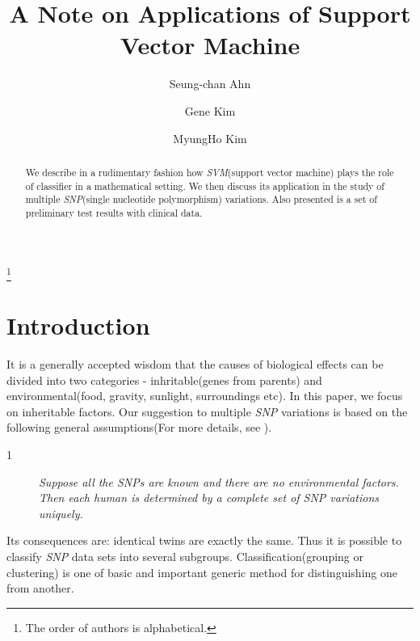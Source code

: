 \documentclass{amsart}%
\theoremstyle{plain}
\numberwithin{equation}{section}
\begin{document}
\title{A Note on Applications of Support Vector Machine}
\author{Seung-chan Ahn}
\address{Fermilab, MS 360, P.O. Box 500, Batavia, IL 60510}
\author{Gene Kim}
\address{19 Gage Road, East Brunswick, NJ 08816}
\author{MyungHo Kim}\thanks{%
The order of authors is alphabetical.}
\address{Genomics Collaborative Inc. 99 Erie Street, Cambridge, MA 02139}


\maketitle

\begin{abstract}
We describe in a rudimentary fashion how \emph{SVM}(support vector machine)
plays the role of classifier in a mathematical setting. We then discuss its
application in the study of multiple \emph{SNP}(single nucleotide
polymorphism) variations. Also presented is a set of preliminary test
results with clinical data.
\end{abstract}

\section{Introduction}

It is a generally accepted wisdom that the causes of biological effects can
be divided into two categories - inhritable(genes from parents) and
environmental(food, gravity, sunlight, surroundings etc). In this paper, we
focus on inheritable factors.  Our suggestion to multiple \emph{SNP}
variations is based on the following general assumptions(For more details,
see \cite{KK}).

\begin{description}
\item[1]  \emph{Suppose all the SNPs are known and there are no
environmental factors. Then each human is determined by a complete set of
SNP variations uniquely.}
\end{description}

Its consequences are: identical twins are exactly the same. Thus it is
possible to classify \emph{SNP} data sets into several subgroups.
Classification(grouping or clustering) is one of basic and important generic
method for distinguishing one from another.
\end{document}
